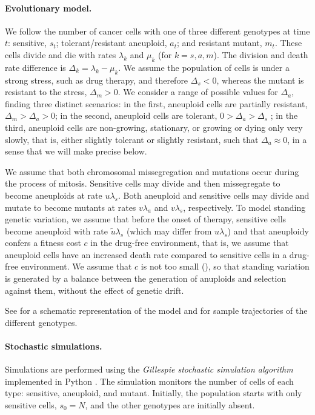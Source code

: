 \documentclass[12pt]{extarticle}
\begin{document}
\paragraph{Evolutionary model.}
We follow the number of cancer cells with one of three different genotypes at time $t$: sensitive, $s_t$; tolerant/resistant aneuploid, $a_t$; and resistant mutant, $m_t$. 
These cells divide and die with rates $\lambda_k$ and $\mu_k$ (for $k=s, a, m$).
The division and death rate difference is $\Delta_k = \lambda_k-\mu_k$.
We assume the population of cells is under a strong stress, such as drug therapy, and therefore $\Delta_s<0$, whereas the mutant is resistant to the stress, $\Delta_m>0$.
We consider a range of possible values for $\Delta_a$, finding three distinct scenarios: in the first, aneuploid cells are partially resistant, $\Delta_m>\Delta_a>0$; in the second, aneuploid cells are tolerant, $0>\Delta_a>\Delta_s$ \citep[see][for the distinction between susceptible, resistant, and tolerant]{brauner2016distinguishing}; in the third, aneuploid cells are non-growing, stationary, or growing or dying only very slowly, that is, either slightly tolerant or slightly resistant, such that $\Delta_a \approx 0$, in a sense that we will make precise below. 

We assume that both chromosomal missegregation and mutations occur during the process of mitosis. 
Sensitive cells may divide and then missegregate to become aneuploids at rate $u\lambda_s$.
Both aneuploid and sensitive cells may divide and mutate to become mutants at rates $v\lambda_{a}$ and $v\lambda_{s}$, respectively.
To model standing genetic variation, we assume that before the onset of therapy, sensitive cells become aneuploid with rate $\tilde{u}\lambda_s$ (which may differ from $u \lambda_s$) and that aneuploidy confers a fitness cost $c$ in the drug-free environment, that is, we assume that aneuploid cells have an increased death rate compared to sensitive cells in a drug-free environment. We assume that $c$ is not too small (), so that standing variation is generated by a balance between the generation of anuploids and selection against them, without the effect of genetic drift.

See  for a schematic representation of the model and  for sample trajectories of the different genotypes. 


\paragraph{Stochastic simulations.} 
Simulations are performed using the \emph{Gillespie stochastic simulation algorithm} \citep{gillespie1976general,gillespie1977exact} implemented in Python \citep{python}.
The simulation monitors the number of cells of each type: sensitive, aneuploid, and mutant. 
Initially, the population starts with only sensitive cells, $s_0=N$, and the other genotypes are initially absent.
\end{document}
